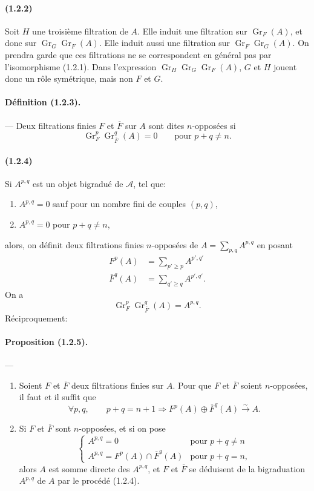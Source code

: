 \documentclass[10pt]{article}
\newcommand{\Gr}{\operatorname{Gr}}
\newcommand{\calA}{\mathcal A}
\newcommand{\iso}{\xrightarrow{\sim}}
\begin{document}
\paragraph{(1.2.2)} Soit $H$ une troisième filtration de $A$. Elle induit une filtration sur $\Gr_F(A)$, et donc sur $\Gr_G\Gr_F(A)$. Elle induit aussi une filtration sur $\Gr_F\Gr_G(A)$. On prendra garde que ces filtrations ne se correspondent en général pas par l'isomorphisme (1.2.1). Dans l'expression $\Gr_H\Gr_G\Gr_F(A)$, $G$ et $H$ jouent donc un rôle symétrique, mais non $F$ et $G$.

\paragraph{Définition (1.2.3).} --- Deux filtrations finies $F$ et $\overline F$ sur $A$ sont dites $n$-opposées si
\[
\Gr_F^p\Gr_{\overline F}^{q}(A)=0\qquad\text{pour }p+q\ne n.
\]

\paragraph{(1.2.4)} Si $A^{p,q}$ est un objet bigradué de $\calA$, tel que:
\begin{enumerate}[label=\alph*)]
\item $A^{p,q}=0$ sauf pour un nombre fini de couples $(p,q)$,
\item $A^{p,q}=0$ pour $p+q\ne n$,
\end{enumerate}
alors, on définit deux filtrations finies $n$-opposées de $A=\sum_{p,q}A^{p,q}$ en posant
\begin{align}
F^p(A)&=\sum_{p'\ge p} A^{p',q'} \tag{1.2.4.1}\\
\overline F^q(A)&=\sum_{q'\ge q} A^{p',q'}. \tag{1.2.4.2}
\end{align}
On a
\[
\tag{1.2.4.3}
\Gr_F^p\Gr_{\overline F}^{q}(A)=A^{p,q}.
\]
Réciproquement:

\paragraph{Proposition (1.2.5).} --- \begin{enumerate}[label=(\roman*)]
\item Soient $F$ et $\overline F$ deux filtrations finies sur $A$. Pour que $F$ et $\overline F$ soient $n$-opposées, il faut et il suffit que
\[
\forall p,q,\qquad p+q=n+1\Rightarrow F^p(A)\oplus\overline F^q(A)\iso A.
\]
\item Si $F$ et $\overline F$ sont $n$-opposées, et si on pose
\[
\begin{cases}
A^{p,q}=0 & \text{pour }p+q\ne n\\
A^{p,q}=F^p(A)\cap\overline F^q(A) & \text{pour }p+q=n,
\end{cases}
\]
alors $A$ est somme directe des $A^{p,q}$, et $F$ et $\overline F$ se déduisent de la bigraduation $A^{p,q}$ de $A$ par le procédé (1.2.4).
\end{enumerate}
\end{document}
